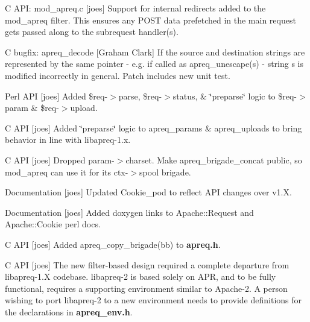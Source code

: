\begin{CompactItemize}
\item 
C API: mod\_\-apreq.c [joes] Support for internal redirects added to the mod\_\-apreq filter. This ensures any POST data prefetched in the main request  gets passed along to the subrequest handler(s).\end{CompactItemize}
\begin{CompactItemize}
\item 
C bugfix: apreq\_\-decode [Graham Clark] If the source and destination strings are represented by the same pointer - e.g. if called as apreq\_\-unescape(s) - string s is modified incorrectly in general. Patch includes new unit test.\end{CompactItemize}
\begin{CompactItemize}
\item 
Perl API [joes] Added \$req-$>$parse, \$req-$>$status, \& \char`\"{}preparse\char`\"{} logic  to \$req-$>$param \& \$req-$>$upload.\end{CompactItemize}
\begin{CompactItemize}
\item 
C API [joes] Added \char`\"{}preparse\char`\"{} logic to apreq\_\-params \& apreq\_\-uploads to bring behavior in line with libapreq-1.x.\end{CompactItemize}
\begin{CompactItemize}
\item 
C API [joes] Dropped param-$>$charset. Make apreq\_\-brigade\_\-concat public, so mod\_\-apreq can use it for its ctx-$>$spool brigade.\end{CompactItemize}
\begin{CompactItemize}
\item 
Documentation [joes] Updated Cookie\_\-pod to reflect API changes over v1.X.\end{CompactItemize}
\begin{CompactItemize}
\item 
Documentation [joes] Added doxygen links to Apache::Request and Apache::Cookie  perl docs.\end{CompactItemize}
\begin{CompactItemize}
\item 
C API [joes] Added apreq\_\-copy\_\-brigade(bb) to {\bf apreq.h}.\end{CompactItemize}
\begin{CompactItemize}
\item 
C API [joes] The new filter-based design required a complete  departure from libapreq-1.X codebase. libapreq-2 is based solely on APR, and to be fully functional,  requires a supporting environment similar to Apache-2. A person wishing to port libapreq-2 to a new environment needs to provide definitions for the declarations in {\bf apreq\_\-env.h}.\end{CompactItemize}
